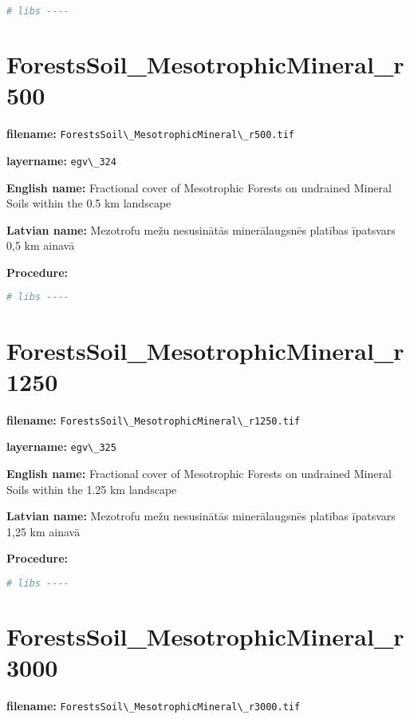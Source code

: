 \documentclass[
]{book}
\newcommand{\passthrough}[1]{#1}
\begin{document}
\begin{lstlisting}[language=R]
# libs ----
\end{lstlisting}

\section{ForestsSoil\_MesotrophicMineral\_r500}\label{ch06.324}

\textbf{filename:} \passthrough{\lstinline!ForestsSoil\_MesotrophicMineral\_r500.tif!}

\textbf{layername:} \passthrough{\lstinline!egv\_324!}

\textbf{English name:} Fractional cover of Mesotrophic Forests on undrained Mineral Soils within the 0.5 km landscape

\textbf{Latvian name:} Mezotrofu mežu nesusinātās minerālaugsnēs platības īpatsvars 0,5 km ainavā

\textbf{Procedure:}

\begin{lstlisting}[language=R]
# libs ----
\end{lstlisting}

\section{ForestsSoil\_MesotrophicMineral\_r1250}\label{ch06.325}

\textbf{filename:} \passthrough{\lstinline!ForestsSoil\_MesotrophicMineral\_r1250.tif!}

\textbf{layername:} \passthrough{\lstinline!egv\_325!}

\textbf{English name:} Fractional cover of Mesotrophic Forests on undrained Mineral Soils within the 1.25 km landscape

\textbf{Latvian name:} Mezotrofu mežu nesusinātās minerālaugsnēs platības īpatsvars 1,25 km ainavā

\textbf{Procedure:}

\begin{lstlisting}[language=R]
# libs ----
\end{lstlisting}

\section{ForestsSoil\_MesotrophicMineral\_r3000}\label{ch06.326}

\textbf{filename:} \passthrough{\lstinline!ForestsSoil\_MesotrophicMineral\_r3000.tif!}
\end{document}
